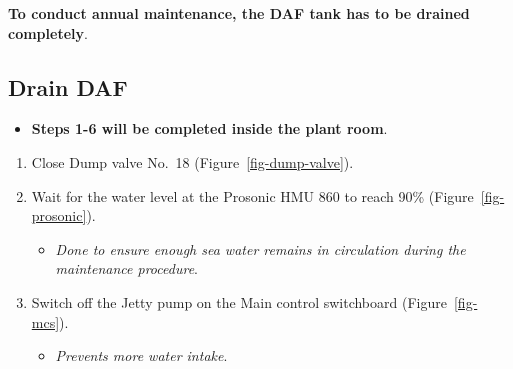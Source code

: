 \documentclass[
  12pt,
]{report}
\providecommand{\tightlist}{%
  \setlength{\itemsep}{0pt}\setlength{\parskip}{0pt}}\usepackage{longtable,booktabs,array}
\begin{document}
\textbf{To conduct annual maintenance, the DAF tank has to be drained
completely}.

\hypertarget{drain-daf}{%
\subsection{Drain DAF}\label{drain-daf}}

\begin{itemize}
\tightlist
\item
  \textbf{Steps 1-6 will be completed inside the plant room}.
\end{itemize}

\begin{enumerate}
\def\labelenumi{\arabic{enumi}.}
\tightlist
\item
  Close Dump valve No.~18 (Figure~\ref{fig-dump-valve}).
\item
  Wait for the water level at the Prosonic HMU 860 to reach 90\%
  (Figure~\ref{fig-prosonic}).

  \begin{itemize}
  \tightlist
  \item
    \emph{Done to ensure enough sea water remains in circulation during
    the maintenance procedure}.
  \end{itemize}
\item
  Switch off the Jetty pump on the Main control switchboard
  (Figure~\ref{fig-mcs}).

  \begin{itemize}
  \tightlist
  \item
    \emph{Prevents more water intake}.
  \end{itemize}
\end{enumerate}
\end{document}
